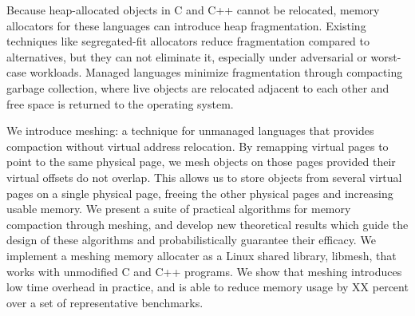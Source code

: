 Because heap-allocated objects in C and C++ cannot be relocated,
memory allocators for these languages can introduce heap
fragmentation. Existing techniques like segregated-fit allocators
reduce fragmentation compared to alternatives, but they can not
eliminate it, especially under adversarial or worst-case
workloads. Managed languages minimize fragmentation through compacting
garbage collection, where live objects are relocated adjacent to each
other and free space is returned to the operating system.

We introduce meshing: a technique for unmanaged languages that
provides compaction without virtual address relocation. By remapping
virtual pages to point to the same physical page, we mesh objects on
those pages provided their virtual offsets do not overlap. This allows
us to store objects from several virtual pages on a single physical
page, freeing the other physical pages and increasing usable memory.
We present a suite of practical algorithms for memory compaction
through meshing, and develop new theoretical results which guide the
design of these algorithms and probabilistically guarantee their
efficacy.  We implement a meshing memory allocater as a Linux shared
library, libmesh, that works with unmodified C and C++ programs.  We
show that meshing introduces low time overhead in practice, and is
able to reduce memory usage by XX percent over a set of representative
benchmarks.
